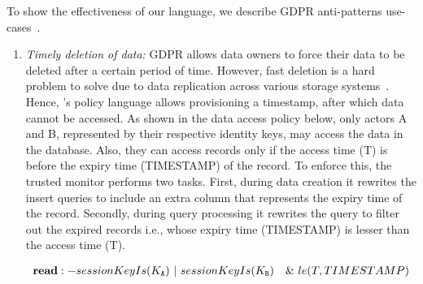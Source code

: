 
%

To show the effectiveness of our language, we describe GDPR anti-patterns use-cases~\cite{shastrihotcloud2019, gdpr-antipattern-cacm}.  %

\begin{enumerate}[wide=0pt]
\item \vspace{3pt} {\em Timely deletion of data:} 
GDPR allows data owners to force their data to be deleted after a certain period of time. However, fast deletion is a hard problem to solve due to data replication across various storage systems~\cite{google-data-del}. Hence, \project{}'s policy language allows provisioning a timestamp, after which data cannot be accessed. As shown in the data access policy below, only actors A and B, represented by their respective identity keys, may access the data in the database. Also, they can access records only if the access time (T) is before the expiry time (TIMESTAMP) of the record. To enforce this, the trusted monitor performs two tasks. First, during data creation it rewrites the insert queries to include an extra column that represents the expiry time of the record. Secondly, during query processing it rewrites the query to filter out the expired records i.e., whose expiry time (TIMESTAMP) is lesser than the access time (T).

\vspace{-4.5mm}
\[
 \begin{array}{@{}l@{}}
 \textbf{read}:-sessionKeyIs(K_{\tt A})~|~sessionKeyIs(K_{\tt B})
 ~~~\&~le(T, TIMESTAMP)
 \end{array}
\]
\vspace{-4.5mm}


\end{enumerate}
